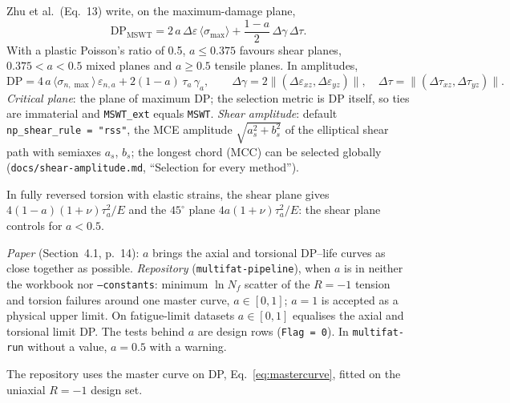  Zhu et al.\ (Eq.~13) write, on the maximum-damage plane,
\begin{equation}
\mathrm{DP}_\mathrm{MSWT} = 2\,a\,\Delta\varepsilon\,\langle\sigma_{\max}\rangle
 + \frac{1-a}{2}\,\Delta\gamma\,\Delta\tau .
\label{eq:mswt-main}
\end{equation}
With a plastic Poisson's ratio of 0.5, $a\le0.375$ favours shear planes, $0.375<a<0.5$ mixed
planes and $a\ge0.5$ tensile planes. In amplitudes,
\begin{equation}
\mathrm{DP} = 4\,a\,\langle\sigma_{n,\max}\rangle\,\varepsilon_{n,a} + 2(1-a)\,\tau_a\,\gamma_a ,
\qquad \Delta\gamma = 2\lVert(\Delta\varepsilon_{xz},\Delta\varepsilon_{yz})\rVert,\quad
\Delta\tau = \lVert(\Delta\tau_{xz},\Delta\tau_{yz})\rVert .
\label{eq:mswt-plane}
\end{equation}
\emph{Critical plane}: the plane of maximum DP; the selection metric is DP itself, so ties are
immaterial and \texttt{MSWT\_ext} equals \texttt{MSWT}. \emph{Shear amplitude}: default
\texttt{np\_shear\_rule = "rss"}, the MCE amplitude $\sqrt{a_s^2+b_s^2}$ of the elliptical shear
path with semiaxes $a_s$, $b_s$; the longest chord (MCC) can be selected globally
(\texttt{docs/shear-amplitude.md}, ``Selection for every method'').

In fully reversed torsion with elastic strains, the shear plane gives $4(1-a)(1+\nu)\tau_a^2/E$ and
the $45^\circ$ plane $4a(1+\nu)\tau_a^2/E$: the shear plane controls for $a<0.5$.

 \emph{Paper} (Section~4.1, p.~14): $a$ brings the axial and
torsional DP--life curves as close together as possible. \emph{Repository}
(\texttt{multifat-pipeline}), when $a$ is in neither the workbook nor \texttt{--constants}: minimum
$\ln N_f$ scatter of the $R=-1$ tension and torsion failures around one master curve,
$a\in[0,1]$; $a=1$ is accepted as a physical upper limit. On fatigue-limit datasets $a\in[0,1]$
equalises the axial and torsional limit DP. The tests behind $a$ are design rows
(\texttt{Flag = 0}). In \texttt{multifat-run} without a value, $a=0.5$ with a warning.

 The repository uses the master curve on DP, Eq.~\eqref{eq:mastercurve}, fitted on the
uniaxial $R=-1$ design set.

